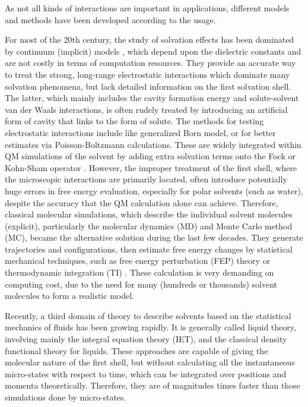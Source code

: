 As not all kinds of interactions are important in applications, different
models and methods have been developed according to the usage.

For most of the 20th century, the study of solvation effects has been
dominated by continuum (implicit) models \citep{Jensen,Cramer_1999},
which depend upon the dielectric constants and are not costly in terms
of computation resources. They provide an accurate way to treat the
strong, long-range electrostatic interactions which dominate many
solvation phenomena, but lack detailed information on the first solvation
shell. The latter, which mainly includes the cavity formation energy
and solute-solvent van der Waals interactions, is often rudely treated
by introducing an artificial form of cavity that links to the form
of solute. The methods for testing electrostatic interactions include
like generalized Born model, or for better estimates via Poisson-Boltzmann
calculations. These are widely integrated within \acs{QM} simulations
of the solvent by adding extra solvation terms onto the Fock or Kohn-Sham
operator \citep{Tomasi_1994_implicit_model,tomasi_quantum_2005}.
However, the improper treatment of the first shell, where the microscopic
interactions are primarily located, often introduce potentially huge
errors in free energy evaluation, especially for polar solvents (such
as water), despite the accuracy that the \acs{QM} calculation alone
can achieve. Therefore, classical molecular simulations, which describe
the individual solvent molecules (explicit), particularly the molecular
dynamics (\acs{MD}) and Monte Carlo method (\acs{MC}), became the
alternative solution during the last few decades. They generate trajectories
and configurations, then estimate free energy changes by statistical
mechanical techniques, such as free energy perturbation (FEP) theory
or thermodynamic integration (TI) \citep{Jorgensen_1995_MC}. These
calculation is very demanding on computing cost, due to the need for
many (hundreds or thousands) solvent molecules to form a realistic
model.

Recently, a third domain of theory to describe solvents based on the
statistical mechanics of fluids has been growing rapidly. It is generally
called liquid theory, involving mainly the integral equation theory
(\acs{IET}), and the classical density functional theory for liquids.
These approaches are capable of giving the molecular nature of the
first shell, but without calculating all the instantaneous micro-states
with respect to time, which can be integrated over positions and momenta
theoretically. Therefore, they are of magnitudes times faster than
those simulations done by micro-states.

